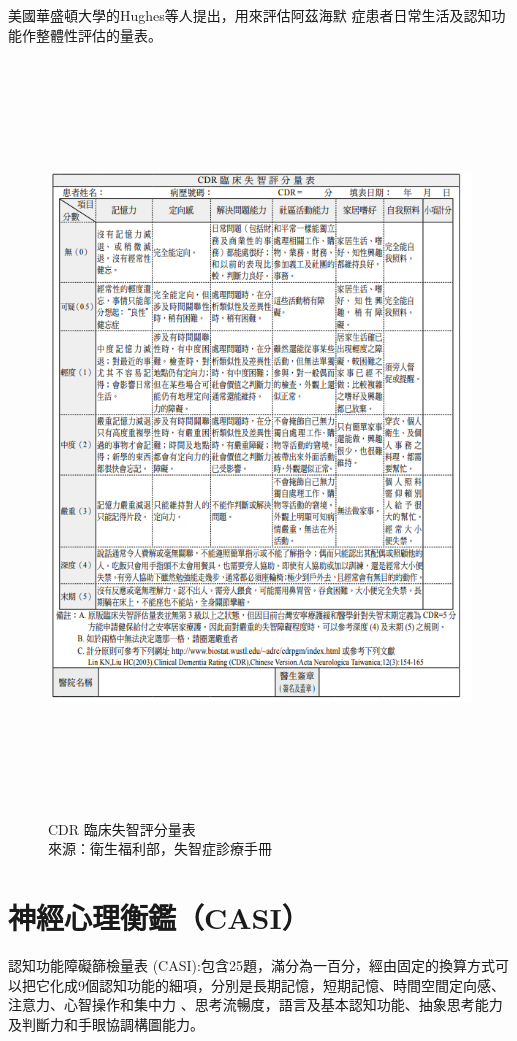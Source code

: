 美國華盛頓大學的Hughes等人提出，用來評估阿茲海默 症患者日常生活及認知功能作整體性評估的量表。

\begin{figure}[H]
	\centerline{\includegraphics[height=20cm]{pic/CDR.PNG}}
	\caption{CDR 臨床失智評分量表\\來源：衛生福利部，失智症診療手冊}
	
	\label{fig:CDR}
\end{figure}




\section{神經心理衡鑑（CASI）}
認知功能障礙篩檢量表 (CASI):包含25題，滿分為一百分，經由固定的換算方式可以把它化成9個認知功能的細項，分別是長期記憶，短期記憶、時間空間定向感、注意力、心智操作和集中力 、思考流暢度，語言及基本認知功能、抽象思考能力及判斷力和手眼協調構圖能力。
